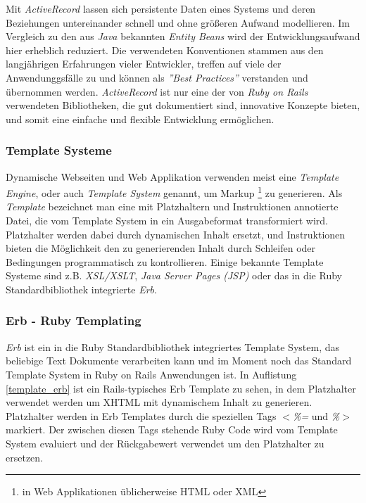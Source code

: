 Mit \textit{ActiveRecord} lassen sich persistente Daten eines Systems
und deren Beziehungen untereinander schnell und ohne größeren Aufwand
modellieren. Im Vergleich zu den aus \textit{Java} bekannten
\textit{Entity Beans} wird der Entwicklungsaufwand hier erheblich
reduziert. Die verwendeten Konventionen stammen aus den langjährigen
Erfahrungen vieler Entwickler, treffen auf viele der Anwendunggsfälle
zu und können als \textit{''Best Practices''} verstanden und
über\-nommen werden. \textit{ActiveRecord} ist nur eine der von
\textit{Ruby on Rails} verwendeten Bibliotheken, die gut dokumentiert
sind, innovative Konzepte bieten, und somit eine einfache und flexible
Entwicklung ermöglichen.

\subsubsection{Template Systeme}

Dynamische Webseiten und Web Applikation verwenden meist eine
\textit{Template Engine}, oder auch \textit{Template System} genannt,
um Markup \footnote{in Web Applikationen üblicherweise HTML oder XML}
zu generieren. Als \textit{Template} bezeichnet man eine mit
Platzhaltern und Instruktionen annotierte Datei, die vom Template
System in ein Ausgabeformat transformiert wird. Platzhalter werden
dabei durch dynamischen Inhalt ersetzt, und Instruktionen bieten die
Möglichkeit den zu generierenden Inhalt durch Schleifen oder
Bedingungen programmatisch zu kontrollieren. Einige bekannte Template
Systeme sind z.B. \textit{XSL/XSLT}, \textit{Java Server Pages (JSP)}
oder das in die Ruby Standardbibliothek integrierte \textit{Erb}.

\subsubsection{Erb - Ruby Templating}

\textit{Erb} ist ein in die Ruby Standardbibliothek integriertes
Template System, das beliebige Text Dokumente verarbeiten kann und im
Moment noch das Standard Template System in Ruby on Rails Anwendungen
ist. In Auflistung \ref{template_erb} ist ein Rails-typisches Erb
Template zu sehen, in dem Platzhalter verwendet werden um XHTML
 mit
dynamischem Inhalt zu generieren. Platzhalter werden in Erb Templates
durch die speziellen Tags \textit{$<$\%=} und \textit{\%$>$}
markiert. Der zwischen diesen Tags stehende Ruby Code wird vom
Template System evaluiert und der Rückgabe\-wert verwendet um den
Platzhalter zu ersetzen.

